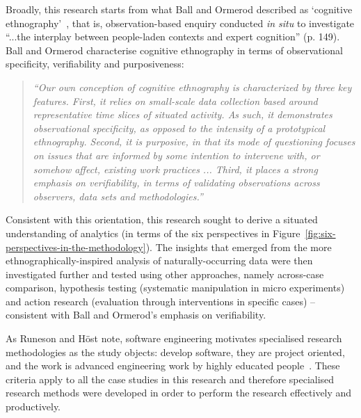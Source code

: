 Broadly, this research starts from what Ball and Ormerod described as `cognitive ethnography'~\citep{ball2000_putting_ethnography_to_work_cognitive_ethnography}, that is, observation-based enquiry conducted \textit{in situ} to investigate ``...the interplay between people-laden contexts and expert cognition'' (p. 149). Ball and Ormerod characterise cognitive ethnography in terms of observational specificity, verifiability and purposiveness: 

\begin{quote}
  \textit{``Our own conception of cognitive ethnography is characterized by three key features. First, it relies on small-scale data collection based around representative time slices of situated activity. As such, it demonstrates observational specificity, as opposed to the intensity of a prototypical ethnography. Second, it is purposive, in that its mode of questioning focuses on issues that are informed by some intention to intervene with, or somehow affect, existing work practices ... Third, it places a strong emphasis on verifiability, in terms of validating observations across observers, data sets and methodologies.''}   ~\citep[p.152]{ball2000_putting_ethnography_to_work_cognitive_ethnography} 
\end{quote} %

Consistent with this orientation, this research sought to derive a situated understanding of analytics (in terms of the six perspectives in Figure~\ref{fig:six-perspectives-in-the-methodology}). The insights that emerged from the more ethnographically-inspired analysis of naturally-occurring data were then investigated further and tested using other approaches, namely across-case comparison, hypothesis testing (systematic manipulation in micro experiments) and action research (evaluation through interventions in specific cases) -- consistent with Ball and Ormerod's emphasis on verifiability.  

As Runeson and Höst note, software engineering motivates specialised research methodologies as the study objects: develop software, they are project oriented, and the work is advanced engineering work by highly educated people~\citep[pp. 132-133]{runeson_2008_guidelines_for_conducting_and_reporting_case_study_research_in_sw_eng}. %
These criteria apply to all the case studies in this research and therefore specialised research methods were developed in order to perform the research effectively and productively. 

